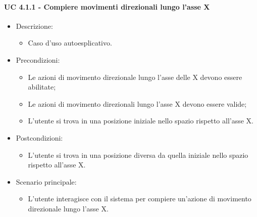 \paragraph{UC 4.1.1 - Compiere movimenti direzionali lungo l'asse X}
\begin{itemize}

	\item Descrizione:
	\begin{itemize}
		\item Caso d'uso autoesplicativo.
	\end{itemize}
	
	\item Precondizioni:
	\begin{itemize}
		\item Le azioni di movimento direzionale lungo l'asse delle X devono essere abilitate;
		\item Le azioni di movimento direzionali lungo l'asse X devono essere valide;
		\item L'utente si trova in una posizione iniziale nello spazio rispetto all'asse X.
	\end{itemize}
	
	\item Postcondizioni:
	\begin{itemize}
		\item L'utente si trova in una posizione diversa da quella iniziale nello spazio rispetto all'asse X.
	\end{itemize}
	
	\item Scenario principale:
	\begin{itemize}
		\item L'utente interagisce con il sistema per compiere un'azione di movimento direzionale lungo l'asse X.
	\end{itemize}
	
\end{itemize}

